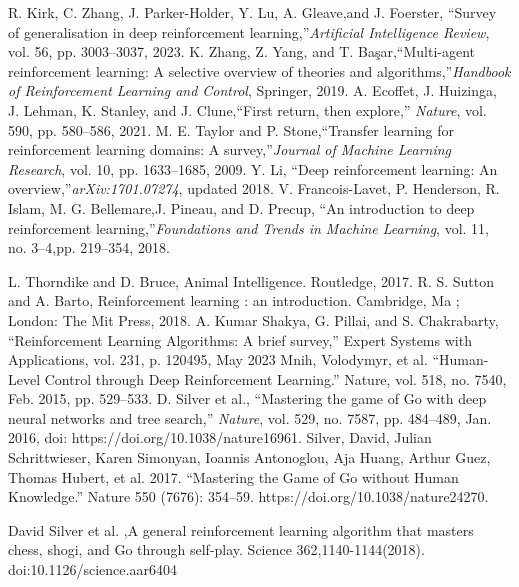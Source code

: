 \documentclass[conference]{IEEEtran}
\begin{document}
\begin{thebibliography}{00}
     R. Kirk, C. Zhang, J. Parker-Holder, Y. Lu, A. Gleave,and J. Foerster, “Survey of generalisation in deep reinforcement learning,”\textit{Artificial Intelligence Review}, vol. 56, pp. 3003–3037, 2023.
     K. Zhang, Z. Yang, and T. Başar,“Multi-agent reinforcement learning: A selective overview of theories and algorithms,”\textit{Handbook of Reinforcement Learning and Control}, Springer, 2019.
     A. Ecoffet, J. Huizinga, J. Lehman, K. Stanley, and J. Clune,“First return, then explore,” \textit{Nature}, vol. 590, pp. 580–586, 2021.
     M. E. Taylor and P. Stone,“Transfer learning for reinforcement learning domains: A survey,”\textit{Journal of Machine Learning Research}, vol. 10, pp. 1633–1685, 2009.
     Y. Li, “Deep reinforcement learning: An overview,”\textit{arXiv:1701.07274}, updated 2018.
     V. Francois-Lavet, P. Henderson, R. Islam, M. G. Bellemare,J. Pineau, and D. Precup, “An introduction to deep reinforcement learning,”\textit{Foundations and Trends in Machine Learning}, vol. 11, no. 3–4,pp. 219–354, 2018.


     L. Thorndike and D. Bruce, Animal Intelligence. Routledge, 2017.
     R. S. Sutton and A. Barto, Reinforcement learning : an introduction. Cambridge, Ma ; London: The Mit Press, 2018.
     A. Kumar Shakya, G. Pillai, and S. Chakrabarty, “Reinforcement Learning Algorithms: A brief survey,” Expert Systems with Applications, vol. 231, p. 120495, May 2023
     Mnih, Volodymyr, et al. “Human-Level Control through Deep Reinforcement Learning.” Nature, vol. 518, no. 7540, Feb. 2015, pp. 529–533.
     D. Silver et al., “Mastering the game of Go with deep neural networks and tree search,” \textit{Nature}, vol. 529, no. 7587, pp. 484–489, Jan. 2016, doi: https://doi.org/10.1038/nature16961.
     Silver, David, Julian Schrittwieser, Karen Simonyan, Ioannis Antonoglou, Aja Huang, Arthur Guez, Thomas Hubert, et al. 2017. “Mastering the Game of Go without Human Knowledge.” Nature 550 (7676): 354–59. https://doi.org/10.1038/nature24270.

     David Silver et al. ,A general reinforcement learning algorithm that masters chess, shogi, and Go through self-play. Science 362,1140-1144(2018). doi:10.1126/science.aar6404


\end{thebibliography}
\end{document}
